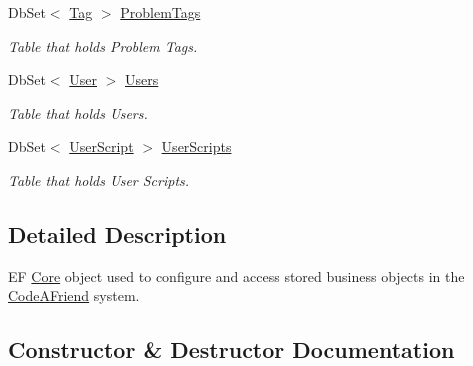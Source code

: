 \begin{DoxyCompactItemize}
Db\+Set$<$ \mbox{\hyperlink{class_code_a_friend_1_1_data_model_1_1_tag}{Tag}} $>$ \mbox{\hyperlink{class_code_a_friend_1_1_repository_1_1_code_a_friend_context_a79eb1ed9a0502b24bb0c4832f5333495}{Problem\+Tags}}
\begin{DoxyCompactList}\small\item\em Table that holds Problem Tags.\end{DoxyCompactList}\item 
Db\+Set$<$ \mbox{\hyperlink{class_code_a_friend_1_1_data_model_1_1_user}{User}} $>$ \mbox{\hyperlink{class_code_a_friend_1_1_repository_1_1_code_a_friend_context_aa4b0cd6d707e8e05e6dbac7fa6b225b9}{Users}}
\begin{DoxyCompactList}\small\item\em Table that holds Users.\end{DoxyCompactList}\item 
Db\+Set$<$ \mbox{\hyperlink{class_code_a_friend_1_1_data_model_1_1_user_script}{User\+Script}} $>$ \mbox{\hyperlink{class_code_a_friend_1_1_repository_1_1_code_a_friend_context_aa2d9d4f6cf003b7ee1364c954ee3fad5}{User\+Scripts}}
\begin{DoxyCompactList}\small\item\em Table that holds User Scripts.\end{DoxyCompactList}\end{DoxyCompactItemize}


\subsection{Detailed Description}
EF \mbox{\hyperlink{namespace_code_a_friend_1_1_core}{Core}} object used to configure and access stored business objects in the \mbox{\hyperlink{namespace_code_a_friend}{Code\+A\+Friend}} system.



\subsection{Constructor \& Destructor Documentation}
\mbox{\label{class_code_a_friend_1_1_repository_1_1_code_a_friend_context_a76820d5c0525ba70dbf679fe5bc3a744}} 
